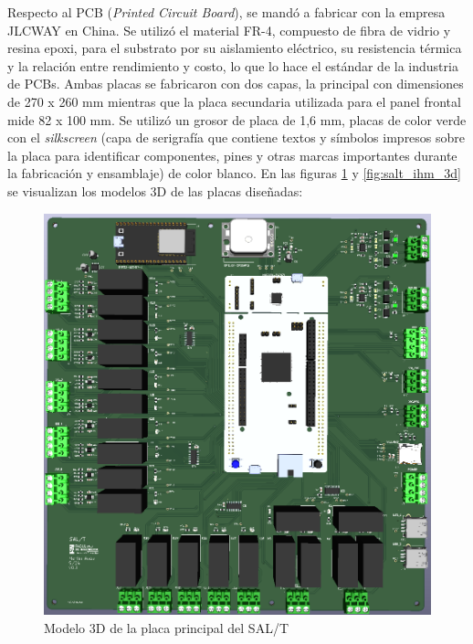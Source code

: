 Respecto al PCB (\textit{Printed Circuit Board}), se mandó a fabricar con la empresa JLCWAY \cite{jlcway} en China. Se utilizó el material FR-4, compuesto de fibra de vidrio y resina epoxi, para el substrato por su aislamiento eléctrico, su resistencia térmica y la relación entre rendimiento y costo, lo que lo hace el estándar de la industria de PCBs. Ambas placas se fabricaron con dos capas, la principal con dimensiones de 270 x 260 mm mientras que la placa secundaria utilizada para el panel frontal mide 82 x 100 mm. Se utilizó un grosor de placa de 1,6 mm, placas de color verde con el \textit{silkscreen} (capa de serigrafía que contiene textos y símbolos impresos sobre la placa para identificar componentes, pines y otras marcas importantes durante la fabricación y ensamblaje) de color blanco. En las figuras \ref{fig:salt_3d} y \ref{fig:salt_ihm_3d} se visualizan los modelos 3D de las placas diseñadas: 

\begin{figure}[H]
    \centering
    \includegraphics[width = \linewidth]{img/pcb_3d.png}
    \caption{Modelo 3D de la placa principal del SAL/T}
    \label{fig:salt_3d}
\end{figure}    




